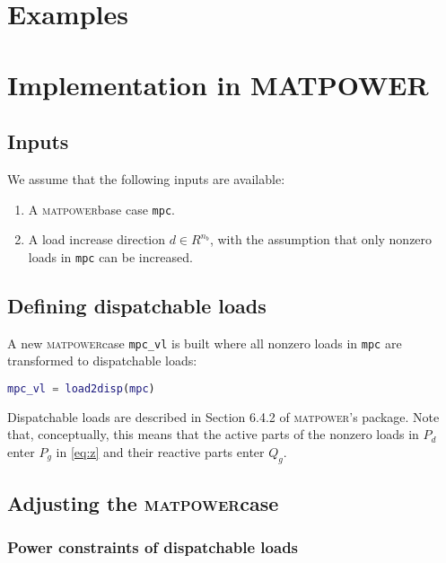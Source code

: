 \documentclass[12pt,a4]{article}
\newcommand*{\codemat}[1]{\texttt{#1}}
\newcommand*{\matpower}{\textsc{matpower}}
\begin{document}
\section{Examples}
\label{sec:examples}



\section{Implementation in MATPOWER}
\label{sec:impl-matp}

\subsection{Inputs}
\label{sec:inputs}

We assume that the following inputs are available:
\begin{enumerate}
\item A \matpower base case \codemat{mpc}.
\item A load increase direction $d \in R^{n_b}$, with the assumption that only nonzero loads in \codemat{mpc} can be increased.
\end{enumerate}

\subsection{Defining dispatchable loads}
\label{sec:defin-disp-loads}

A new \matpower case \codemat{mpc\_vl} is built where all nonzero loads in \codemat{mpc} are transformed to dispatchable loads:
\begin{lstlisting}[language=Matlab]
mpc_vl = load2disp(mpc)  
\end{lstlisting}
Dispatchable loads are described in Section 6.4.2 of \matpower's package.
Note that, conceptually, this means that the active parts of the nonzero loads in $P_d$ enter $P_g$ in \eqref{eq:z} and their reactive parts enter $Q_g$.

\subsection{Adjusting the \matpower case}
\label{sec:adjust-matp-case}

\subsubsection{Power constraints of dispatchable loads}
\label{sec:limits-disp-loads}
\end{document}
